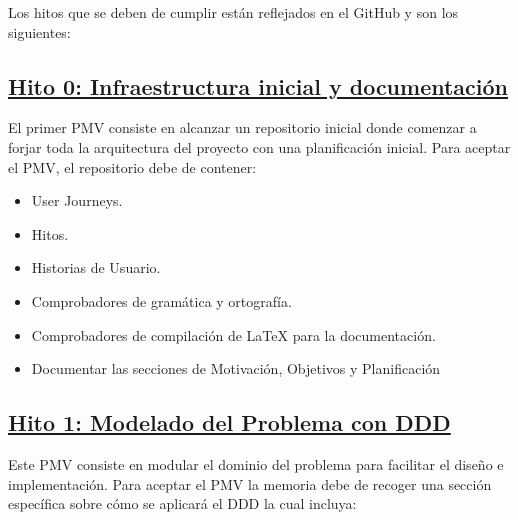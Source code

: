 \begin{figure}[!tb]
    \begin{center}
        \label{Figura-Ciudades}
    \end{center}
\end{figure}


Los hitos que se deben de cumplir están reflejados en el GitHub y son los siguientes:

\subsection*{\href{https://github.com/RubenDelgadoPareja/TFG-Triage-Inteligente-Consulta-Medica/milestone/1}{Hito 0: Infraestructura inicial y documentación}}
\label{sb:hito0}

El primer PMV consiste en alcanzar un repositorio inicial donde comenzar a forjar toda la arquitectura del proyecto con una planificación inicial.
Para aceptar el PMV, el repositorio debe de contener:

\begin{itemize}
    \item{User Journeys.}
    \item{Hitos.}
    \item{Historias de Usuario.}
    \item{Comprobadores de gramática y ortografía.}
    \item{Comprobadores de compilación de LaTeX para la documentación.}
    \item{Documentar las secciones de Motivación, Objetivos y Planificación}
\end{itemize}

\subsection*{\href{https://github.com/RubenDelgadoPareja/TFG-Triage-Inteligente-Consulta-Medica/milestone/7}{Hito 1: Modelado del Problema con DDD}}
\label{sb:hito1}

Este PMV consiste en modular el dominio del problema para facilitar el diseño e implementación.
Para aceptar el PMV la memoria debe de recoger una sección específica sobre cómo se aplicará el DDD la cual incluya:

